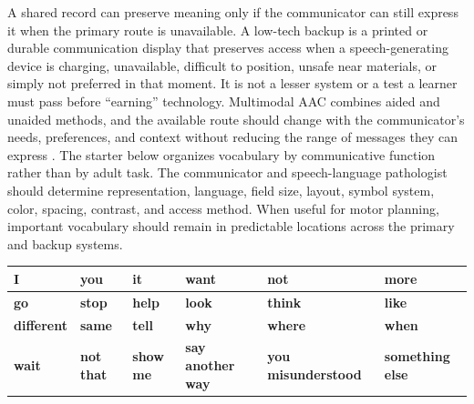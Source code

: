 
\vspace{-0.5cm}

A shared record can preserve meaning only if the communicator can still express it when the primary route is unavailable. A low-tech backup is a printed or durable communication display that preserves access when a speech-generating device is charging, unavailable, difficult to position, unsafe near materials, or simply not preferred in that moment. It is not a lesser system or a test a learner must pass before ``earning'' technology. Multimodal AAC combines aided and unaided methods, and the available route should change with the communicator's needs, preferences, and context without reducing the range of messages they can express \citep{ashaAAC,mirenda2015aids}. The starter below organizes vocabulary by communicative function rather than by adult task. The communicator and speech-language pathologist should determine representation, language, field size, layout, symbol system, color, spacing, contrast, and access method. When useful for motor planning, important vocabulary should remain in predictable locations across the primary and backup systems.


\renewcommand{\arraystretch}{1.00}
\setlength{\tabcolsep}{3pt}

\begin{tabularx}{\textwidth}{|>{\centering\arraybackslash}p{0.60in}|>{\centering\arraybackslash}p{0.70in}|>{\centering\arraybackslash}p{0.70in}|>{\centering\arraybackslash}X|>{\centering\arraybackslash}X|>{\centering\arraybackslash}X|}
\hline
\rowcolor{SoftBlue}
\textbf{I} & \textbf{you} & \textbf{it} & \textbf{want} & \textbf{not} & \textbf{more} \\
\hline

\rowcolor{SoftGreen}
\textbf{go} & \textbf{stop} & \textbf{help} & \textbf{look} & \textbf{think} & \textbf{like} \\
\hline

\rowcolor{SoftGold}
\textbf{different} & \textbf{same} & \textbf{tell} & \textbf{why} & \textbf{where} & \textbf{when} \\
\hline

\rowcolor{SoftRose}
\textbf{wait} & \textbf{not that} & \textbf{show me} & \textbf{say another way} & \textbf{you misunderstood} & \textbf{something else} \\
\hline
\end{tabularx}

